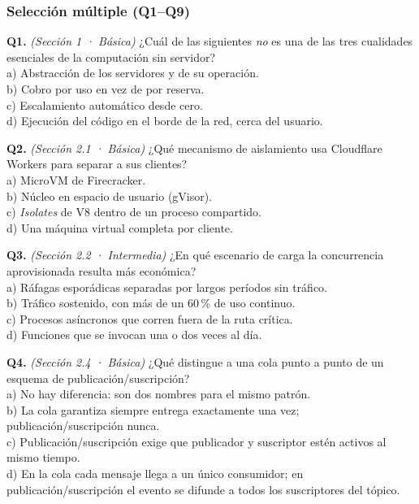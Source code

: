 \documentclass[12pt, letterpaper, table, xcdraw]{inf-pucv}
\begin{document}
\subsubsection*{Selección múltiple (Q1--Q9)}

\textbf{Q1.} \textit{(Sección 1 · Básica)} ¿Cuál de las siguientes \emph{no} es una de las tres cualidades esenciales de la computación sin servidor? \\
a) Abstracción de los servidores y de su operación. \\
b) Cobro por uso en vez de por reserva. \\
c) Escalamiento automático desde cero. \\
d) Ejecución del código en el borde de la red, cerca del usuario.

\textbf{Q2.} \textit{(Sección 2.1 · Básica)} ¿Qué mecanismo de aislamiento usa Cloudflare Workers para separar a sus clientes? \\
a) MicroVM de Firecracker. \\
b) Núcleo en espacio de usuario (gVisor). \\
c) \emph{Isolates} de V8 dentro de un proceso compartido. \\
d) Una máquina virtual completa por cliente.

\textbf{Q3.} \textit{(Sección 2.2 · Intermedia)} ¿En qué escenario de carga la concurrencia aprovisionada resulta más económica? \\
a) Ráfagas esporádicas separadas por largos períodos sin tráfico. \\
b) Tráfico sostenido, con más de un 60\,\% de uso continuo. \\
c) Procesos asíncronos que corren fuera de la ruta crítica. \\
d) Funciones que se invocan una o dos veces al día.

\textbf{Q4.} \textit{(Sección 2.4 · Básica)} ¿Qué distingue a una cola punto a punto de un esquema de publicación/suscripción? \\
a) No hay diferencia: son dos nombres para el mismo patrón. \\
b) La cola garantiza siempre entrega exactamente una vez; publicación/suscripción nunca. \\
c) Publicación/suscripción exige que publicador y suscriptor estén activos al mismo tiempo. \\
d) En la cola cada mensaje llega a un único consumidor; en publicación/suscripción el evento se difunde a todos los suscriptores del tópico.
\end{document}
